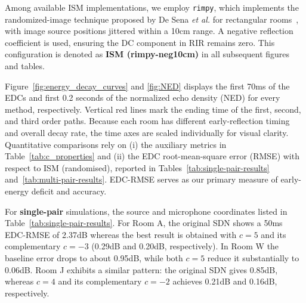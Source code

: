 \documentclass[journal]{IEEEtran}
\begin{document}
Among available ISM implementations, we employ \texttt{rimpy}, which implements the randomized-image technique proposed by De Sena \textit{et al.} for rectangular rooms~\cite{enzo_rism}, with image source positions jittered within a 10cm range. A negative reflection coefficient is used, ensuring the DC component in RIR remains zero. This configuration is denoted as \textbf{ISM (rimpy-neg10cm)} in all subsequent figures and tables. 



Figure~\ref{fig:energy_decay_curves} and \ref{fig:NED} displays the first 70ms of the EDCs and first 0.2 seconds of the normalized echo density (NED) for every method, respectively. Vertical red lines mark the ending time of the first, second, and third order paths. Because each room has different early-reflection timing and overall decay rate, the time axes are scaled individually for visual clarity.
Quantitative comparisons rely on (i) the auxiliary metrics in Table~\ref{tab:c_properties} and (ii) the EDC root-mean-square error (RMSE) with respect to ISM (randomised), reported in Tables~\ref{tab:single-pair-results} and~\ref{tab:multi-pair-results}. EDC-RMSE serves as our primary measure of early-energy deficit and accuracy.

For \textbf{single-pair} simulations, the source and microphone coordinates listed in Table~\ref{tab:single-pair-results}. 
For Room A, the original SDN shows a 50ms EDC-RMSE of 2.37dB whereas the best result is obtained with $c=5$ and its complementary $c=-3$ (0.29dB and 0.20dB, respectively). In Room W the baseline error drops to about 0.95dB, while both $c=5$ reduce it substantially to 0.06dB. 
Room J exhibits a similar pattern: the original SDN gives 0.85dB, whereas $c=4$ and its complementary $c=-2$ achieves 0.21dB and 0.16dB, respectively.
\end{document}
